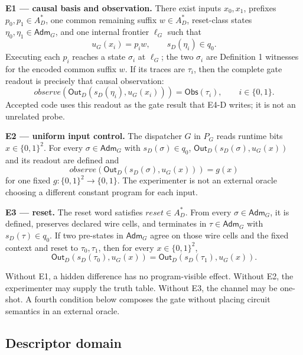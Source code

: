 \documentclass[conference]{IEEEtran}
\begin{document}
\medskip
\noindent\textbf{E1 --- causal basis and observation.}
There exist inputs $x_0,x_1$, prefixes $p_0,p_1\in A_D^*$, one common remaining suffix $w\in A_D^*$, reset-class states $\eta_0,\eta_1\in\mathsf{Adm}_G$, and one internal frontier $\ell_G$ such that
\begin{equation}
u_G(x_i)=p_iw,
\qquad s_D(\eta_i)\in q_0.
\end{equation}
Executing each $p_i$ reaches a state $\sigma_i$ at $\ell_G$; the two $\sigma_i$ are Definition 1 witnesses for the encoded common suffix $w$. If its traces are $\tau_i$, then the complete gate readout is precisely that causal observation:
\begin{equation}
\mathit{observe}(\mathsf{Out}_D(s_D(\eta_i),u_G(x_i)))
=\mathsf{Obs}(\tau_i),\qquad i\in\{0,1\}.
\end{equation}
Accepted code uses this readout as the gate result that E4-D writes; it is not an unrelated probe.

\medskip
\noindent\textbf{E2 --- uniform input control.}
The dispatcher $G$ in $P_G$ reads runtime bits $x\in\{0,1\}^2$. For every $\sigma\in\mathsf{Adm}_G$ with $s_D(\sigma)\in q_0$, $\mathsf{Out}_D(s_D(\sigma),u_G(x))$ and its readout are defined and
\begin{equation}
\mathit{observe}(\mathsf{Out}_D(s_D(\sigma),u_G(x)))=g(x)
\end{equation}
for one fixed $g:\{0,1\}^2\to\{0,1\}$. The experimenter is not an external oracle choosing a different constant program for each input.

\medskip
\noindent\textbf{E3 --- reset.}
The reset word satisfies $\mathit{reset}\in A_D^*$. From every $\sigma\in\mathsf{Adm}_G$, it is defined, preserves declared wire cells, and terminates in $\tau\in\mathsf{Adm}_G$ with $s_D(\tau)\in q_0$. If two pre-states in $\mathsf{Adm}_G$ agree on those wire cells and the fixed context and reset to $\tau_0,\tau_1$, then for every $x\in\{0,1\}^2$,
\begin{equation}
\mathsf{Out}_D(s_D(\tau_0),u_G(x))
=
\mathsf{Out}_D(s_D(\tau_1),u_G(x)).
\end{equation}

Without E1, a hidden difference has no program-visible effect. Without E2, the experimenter may supply the truth table. Without E3, the channel may be one-shot. A fourth condition below composes the gate without placing circuit semantics in an external oracle.

\subsection{Descriptor domain}
\end{document}

